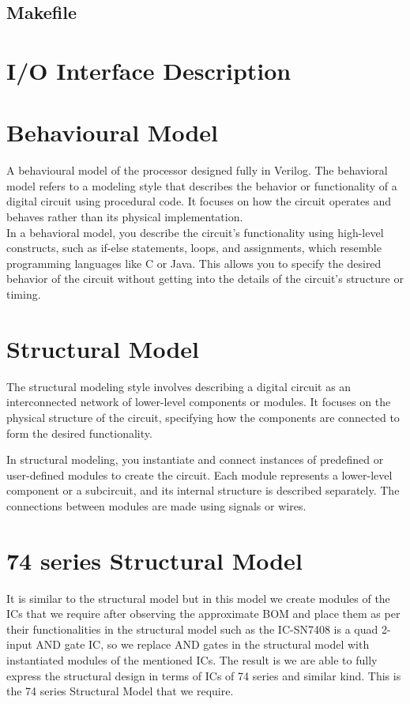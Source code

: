 \documentclass{article}
\begin{document}
\subsection{Makefile}
\section{\textbf{I/O Interface Description}}
\section{\textbf{Behavioural Model}}
A behavioural model of the processor designed fully in Verilog.
The behavioral model refers to a modeling style that describes the
behavior or functionality of a digital circuit using procedural
code. It focuses on how the circuit operates and behaves rather than
its physical implementation. \\

In a behavioral model, you describe the circuit's functionality using
high-level constructs, such as if-else statements, loops, and
assignments, which resemble programming languages like C or Java. This
allows you to specify the desired behavior of the circuit without
getting into the details of the circuit's structure or timing.
\section{\textbf{Structural Model}}
The structural modeling style involves describing a digital circuit as
an interconnected network of lower-level components or modules. It
focuses on the physical structure of the circuit, specifying how the
components are connected to form the desired functionality.

In structural modeling, you instantiate and connect instances of
predefined or user-defined modules to create the circuit. Each module
represents a lower-level component or a subcircuit, and its internal
structure is described separately. The connections between modules are
made using signals or wires.
\section{\textbf{74 series Structural Model}}
It is similar to the structural model but in this model we create
modules of the ICs that we require after observing the approximate BOM
and place them as per their functionalities in the structural model
such as the IC-SN7408 is a quad 2-input AND gate IC, so we replace AND
gates in the structural model with instantiated modules of the
mentioned ICs. The result is we are able to fully express the
structural design in terms of ICs of 74 series and similar kind. This
is the 74 series Structural Model that we require.
\end{document}
